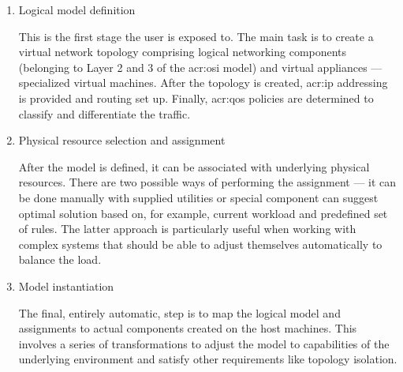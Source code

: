 \documentclass[11pt]{book}
\begin{document}
          \begin{enumerate}

            \item Logical model definition

              This is the first stage the user is exposed to. The main task is to create a virtual network topology
              comprising logical networking components (belonging to Layer 2 and 3 of the \gls{acr:osi} model) and
              virtual appliances --- specialized virtual machines. After the topology is created, \gls{acr:ip}
              addressing is provided and routing set up. Finally, \gls{acr:qos} policies are determined to classify and
              differentiate the traffic.

            \item Physical resource selection and assignment

              After the model is defined, it can be associated with underlying physical resources. There are two
              possible ways of performing the assignment --- it can be done manually with supplied utilities or special
              component can suggest optimal solution based on, for example, current workload and predefined set of
              rules. The latter approach is particularly useful when working with complex systems that should be able to
              adjust themselves automatically to balance the load.

            \item Model instantiation

              The final, entirely automatic, step is to map the logical model and assignments to actual components
              created on the host machines. This involves a series of transformations to adjust the model to
              capabilities of the underlying environment and satisfy other requirements like topology isolation.
                  
          \end{enumerate}
\end{document}
